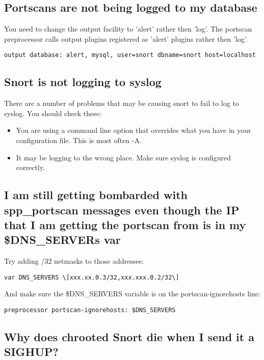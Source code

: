 \documentclass{article}
\begin{document}
\subsection{Portscans are not being logged to my database }

You need to change the output facility to 'alert' rather then 'log'.  The 
portscan preprocessor calls output plugins registered as 'alert' plugins 
rather then 'log'.

\begin{verbatim}output database: alert, mysql, user=snort dbname=snort host=localhost\end{verbatim}

\subsection{Snort is not logging to syslog}

There are a number of problems that may be causing snort to fail to log to syslog.  You should check these:
\begin{itemize}
\item You are using a command line option that overrides what you have in your configuration file.  This is most often -A.
\item It may be logging to the wrong place.  Make sure syslog is configured correctly.
\end{itemize}


\subsection{I am still getting bombarded with spp\_portscan messages even though the IP that I am getting the portscan from is in my \$DNS\_SERVERs var }

Try adding /32 netmasks to those addresses:

\begin{verbatim}var DNS_SERVERS \[xxx.xx.0.3/32,xxx.xxx.0.2/32\]\end{verbatim}

And make sure the \$DNS\_SERVERS variable is on the portscan-ignorehosts line:

\begin{verbatim}preprocessor portscan-ignorehosts: $DNS_SERVERS\end{verbatim}

\subsection{Why does chrooted Snort die when I send it a SIGHUP? \label{chroot}}
\end{document}
